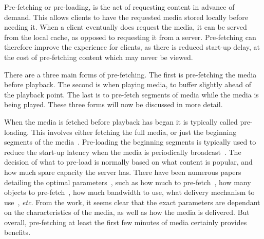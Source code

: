 

    Pre-fetching or pre-loading, is the act of requesting content in advance of demand. This allows clients to have the requested media stored locally before needing it. When a client eventually does request the media, it can be served from the local cache, as opposed to requesting it from a server. Pre-fetching can therefore improve the experience for clients, as there is reduced start-up delay, at the cost of pre-fetching content which may never be viewed.


    There are a three main forms of pre-fetching. The first is pre-fetching the media before playback. The second is when playing media, to buffer slightly ahead of the playback point. The last is to pre-fetch segments of media while the media is being played. These three forms will now be discussed in more detail.

    When the media is fetched before playback has began it is typically called pre-loading. This involves either fetching the full media, or just the beginning segments of the media~\cite{paris2001cap}. Pre-loading the beginning segments is typically used to reduce the start-up latency when the media is periodically broadcast~\cite{paris1999zdb}. The decision of what to pre-load is normally based on what content is popular, and how much spare capacity the server has. There have been numerous papers detailing the optimal parameters~\cite{barnoy2008odm}, such as how much to pre-fetch~\cite{paris2001stp}, how many objects to pre-fetch~\cite{paris2002bpv}, how much bandwidth to use, what delivery mechanism to use~\cite{chung2003evb}, \emph{etc}. From the work, it seems clear that the exact parameters are dependant on the characteristics of the media, as well as how the media is delivered. But overall, pre-fetching at least the first few minutes of media certainly provides benefits.

